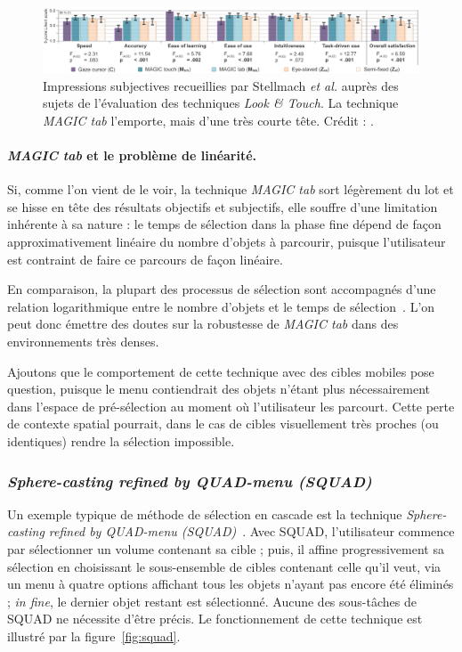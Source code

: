 	\begin{figure}[!htb]
		\centering
		\includegraphics[width=\textwidth]{figures/ch2/latSubj}
		\caption[\emph{Look \&{} Touch -- impressions subjectives}]{Impressions subjectives recueillies par Stellmach \emph{et al.} auprès des sujets de l'évaluation des techniques \emph{Look \&{} Touch}. La technique \emph{MAGIC tab} l'emporte, mais d'une très courte tête. Crédit : \cite{stellmach2012look}.}
		\label{fig:latSubj}
	\end{figure}
	
	\paragraph{\emph{MAGIC tab} et le problème de linéarité.}
	Si, comme l'on vient de le voir, la technique \emph{MAGIC tab} sort légèrement du lot et se hisse en tête des résultats objectifs et subjectifs, elle souffre d'une limitation inhérente à sa nature : le temps de sélection dans la phase fine dépend de façon approximativement linéaire du nombre d'objets à parcourir, puisque l'utilisateur est contraint de faire ce parcours de façon linéaire.
	
	En comparaison, la plupart des processus de sélection sont accompagnés d'une relation logarithmique entre le nombre d'objets et le temps de sélection~\cite{hick1952rate, hyman1953stimulus}. L'on peut donc émettre des doutes sur la robustesse de \emph{MAGIC tab} dans des environnements très denses.
	
	Ajoutons que le comportement de cette technique avec des cibles mobiles pose question, puisque le menu contiendrait des objets n'étant plus nécessairement dans l'espace de pré-sélection au moment où l'utilisateur les parcourt. Cette perte de contexte spatial pourrait, dans le cas de cibles visuellement très proches (ou identiques) rendre la sélection impossible.
	
	\subsubsection{\emph{Sphere-casting refined by QUAD-menu
(SQUAD)}}
	Un exemple typique de méthode de sélection en cascade est la technique \emph{Sphere-casting refined by QUAD-menu
(SQUAD)}~\cite{kopper2011rapid}. Avec SQUAD, l'utilisateur commence par sélectionner un volume contenant sa cible ; puis, il affine progressivement sa sélection en choisissant le sous-ensemble de cibles contenant celle qu'il veut, via un menu à quatre options affichant tous les objets n'ayant pas encore été éliminés ; \emph{in fine}, le dernier objet restant est sélectionné. Aucune des sous-tâches de SQUAD ne nécessite d'être précis. Le fonctionnement de cette technique est illustré par la figure~\ref{fig:squad}.

